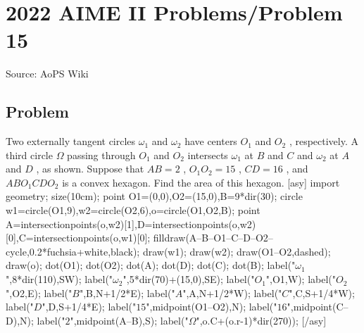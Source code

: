 \documentclass[12pt]{article}
\begin{document}
\section*{{2022 AIME II Problems/Problem 15}}
Source: AoPS Wiki

\subsection*{Problem}
Two externally tangent circles $\omega_1$ and $\omega_2$ have centers $O_1$ and $O_2$ , respectively. A third circle $\Omega$ passing through $O_1$ and $O_2$ intersects $\omega_1$ at $B$ and $C$ and $\omega_2$ at $A$ and $D$ , as shown. Suppose that $AB = 2$ , $O_1O_2 = 15$ , $CD = 16$ , and $ABO_1CDO_2$ is a convex hexagon. Find the area of this hexagon. [asy] import geometry; size(10cm); point O1=(0,0),O2=(15,0),B=9*dir(30); circle w1=circle(O1,9),w2=circle(O2,6),o=circle(O1,O2,B); point A=intersectionpoints(o,w2)[1],D=intersectionpoints(o,w2)[0],C=intersectionpoints(o,w1)[0]; filldraw(A--B--O1--C--D--O2--cycle,0.2*fuchsia+white,black); draw(w1); draw(w2); draw(O1--O2,dashed); draw(o); dot(O1); dot(O2); dot(A); dot(D); dot(C); dot(B); label("$\omega_1$",8*dir(110),SW); label("$\omega_2$",5*dir(70)+(15,0),SE); label("$O_1$",O1,W); label("$O_2$",O2,E); label("$B$",B,N+1/2*E); label("$A$",A,N+1/2*W); label("$C$",C,S+1/4*W); label("$D$",D,S+1/4*E); label("$15$",midpoint(O1--O2),N); label("$16$",midpoint(C--D),N); label("$2$",midpoint(A--B),S); label("$\Omega$",o.C+(o.r-1)*dir(270)); [/asy]
\end{document}
